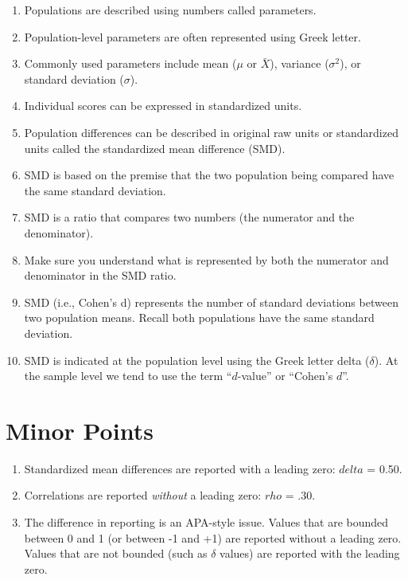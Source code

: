 \documentclass[
]{krantz}
\begin{document}
\begin{enumerate}
\def\labelenumi{\arabic{enumi}.}
\item
  Populations are described using numbers called parameters.
\item
  Population-level parameters are often represented using Greek letter.
\item
  Commonly used parameters include mean (\(\mu\) or \(\bar{X}\)), variance (\(\sigma^2\)), or standard deviation (\(\sigma\)).
\item
  Individual scores can be expressed in standardized units.
\item
  Population differences can be described in original raw units or standardized units called the standardized mean difference (SMD).
\item
  SMD is based on the premise that the two population being compared have the same standard deviation.
\item
  SMD is a ratio that compares two numbers (the numerator and the denominator).
\item
  Make sure you understand what is represented by both the numerator and denominator in the SMD ratio.
\item
  SMD (i.e., Cohen's d) represents the number of standard deviations between two population means. Recall both populations have the same standard deviation.
\item
  SMD is indicated at the population level using the Greek letter delta (\(\delta\)). At the sample level we tend to use the term ``\(d\)-value'' or ``Cohen's \(d\)''.
\end{enumerate}

\hypertarget{minor-points}{%
\section{Minor Points}\label{minor-points}}

\begin{enumerate}
\def\labelenumi{\arabic{enumi}.}
\item
  Standardized mean differences are reported with a leading zero: \(delta\) = 0.50.
\item
  Correlations are reported \emph{without} a leading zero: \(rho\) = .30.
\item
  The difference in reporting is an APA-style issue. Values that are bounded between 0 and 1 (or between -1 and +1) are reported without a leading zero. Values that are not bounded (such as \(\delta\) values) are reported with the leading zero.
\end{enumerate}
\end{document}
